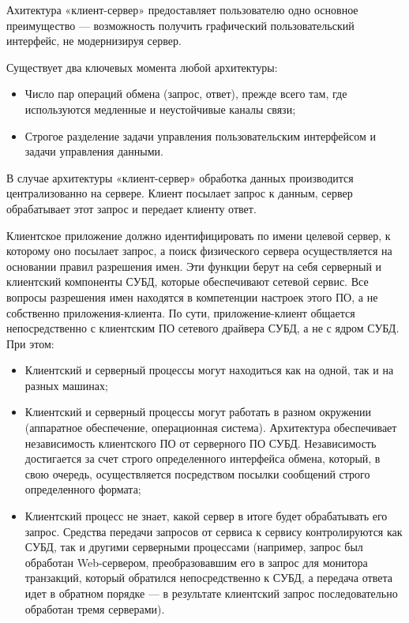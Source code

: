 Ахитектура «клиент-сервер» предоставляет пользователю одно основное преимущество — возможность получить графический пользовательский интерфейс, не модернизируя сервер.

Существует два ключевых момента любой архитектуры:
\begin{itemize}
    \item Число пар операций обмена (запрос, ответ), прежде всего там, где используются медленные и неустойчивые каналы связи;
    \item Строгое разделение задачи управления пользовательским интерфейсом и задачи управления данными.
\end{itemize}

В случае архитектуры «клиент-сервер» обработка данных производится централизованно на сервере.
Клиент посылает запрос к данным, сервер обрабатывает этот запрос и передает клиенту ответ.

Клиентское приложение должно идентифицировать по имени целевой сервер, к которому оно посылает запрос, а поиск физического сервера осуществляется на основании правил разрешения имен.
Эти функции берут на себя серверный и клиентский компоненты СУБД, которые обеспечивают сетевой сервис.
Все вопросы разрешения имен находятся в компетенции настроек этого ПО, а не собственно приложения-клиента.
По сути, приложение-клиент общается непосредственно с клиентским ПО сетевого драйвера СУБД, а не с ядром СУБД.
При этом:
\begin{itemize}
    \item Клиентский и серверный процессы могут находиться как на одной, так и на разных машинах;
    \item Клиентский и серверный процессы могут работать в разном окружении (аппаратное обеспечение, операционная система).
    Архитектура обеспечивает независимость клиентского ПО от серверного ПО СУБД.
    Независимость достигается за счет строго определенного интерфейса обмена, который, в свою очередь, осуществляется посредством посылки сообщений строго определенного формата;
    \item Клиентский процесс не знает, какой сервер в итоге будет обрабатывать его запрос.
    Средства передачи запросов от сервиса к сервису контролируются как СУБД, так и другими серверными процессами (например, запрос был обработан Web-сервером, преобразовавшим его в запрос для монитора транзакций, который обратился непосредственно к СУБД, а передача ответа идет в обратном порядке — в результате клиентский запрос последовательно обработан тремя серверами).
\end{itemize}

